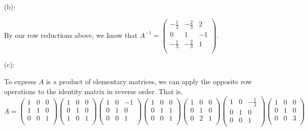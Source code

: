 \documentclass{eh-homework}
\begin{document}
\begin{question}{2}
        \medskip

        (b):

        By our row reductions above, we know that \(A^{-1} = \begin{pmatrix}
            -\frac{1}{3} & -\frac{2}{3} & 2 \\
            0 & 1 & -1 \\
            -\frac{1}{3} & -\frac{2}{3} & 1 \\
        \end{pmatrix}\).

        \medskip

        (c):

        To express \(A\) is a product of elementary matrices, we can apply the opposite row operations to the identity matrix in reverse order. That is,
        \[
            A = \begin{pmatrix}
                1 & 0 &  0 \\
                1 & 1 &  0 \\
                0 & 0 &  1 \\
            \end{pmatrix}
            \begin{pmatrix}
                1 & 0 &  0 \\
                0 & 1 &  0 \\
                1 & 0 &  1 \\
            \end{pmatrix}
            \begin{pmatrix}
                1 & 0 &  -1 \\
                0 & 1 &  0 \\
                0 & 0 &  1 \\
            \end{pmatrix}
            \begin{pmatrix}
                1 & 0 &  0 \\
                0 & 1 &  1 \\
                0 & 0 &  1 \\
            \end{pmatrix}
            \begin{pmatrix}
                1 & 0 &  0 \\
                0 & 1 &  0 \\
                0 & 2 &  1 \\
            \end{pmatrix}
            \begin{pmatrix}
                1 & 0 &  -\frac{1}{3} \\
                0 & 1 &  0 \\
                0 & 0 &  1 \\
            \end{pmatrix}
            \begin{pmatrix}
                1 & 0 &  0 \\
                0 & 1 &  0 \\
                0 & 0 &  3 \\
            \end{pmatrix}
        \]
    \end{question}
\end{document}
